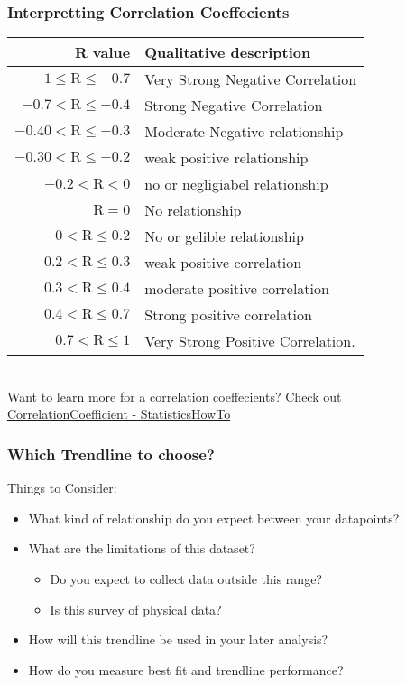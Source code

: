 \documentclass[12pt]{beamer}
\begin{document}
\begin{frame}
	\frametitle{Interpretting Correlation Coeffecients}
	\begin{tabular}{r | l }
		R value & Qualitative description\\
		\hline
		$-1 \leq \text{R}\leq-0.7$ & Very Strong Negative Correlation \\
		$-0.7<\text{R} \leq -0.4 $&  Strong Negative Correlation \\
		$-0.40 < \text{R} \leq -0.3$ & Moderate Negative relationship \\
		$-0.30 < \text{R} \leq -0.2 $ & weak positive relationship \\
		$-0.2 < \text{R} < 0  $&  no or negligiabel relationship\\
		$\text{R}=0$ & No relationship\\
		$0<\text{R} \leq 0.2 $& No or gelible relationship \\
		$0.2 < \text{R} \leq 0.3 $ &weak positive correlation \\
		$0.3 < \text{R} \leq 0.4$ &  moderate positive correlation \\
		$0.4 < \text{R} \leq 0.7$ & Strong positive correlation\\
		$0.7< \text{R} \leq 1$ & Very Strong Positive Correlation.
	\end{tabular}\\
	\bigskip
	Want to learn more for a correlation coeffecients? Check out
	\textcolor{blue}{
	\href{https://www.statisticshowto.com/probability-and-statistics/correlation-coefficient-formula/}{CorrelationCoefficient - StatisticsHowTo}}
\end{frame}
	\begin{frame}
		\frametitle{Which Trendline to choose?}
	Things to Consider:
	\begin{itemize}
		\item What kind of relationship do you expect between your datapoints?
		\item What are the limitations of this dataset?
			\begin{itemize}
				\item Do you expect to collect data outside this range?
				\item Is this survey of physical data?
			\end{itemize}
		\item How will this trendline be used in your later analysis?
		\item How do you measure best fit and trendline performance?	
\end{itemize}
	\end{frame}
\end{document}
